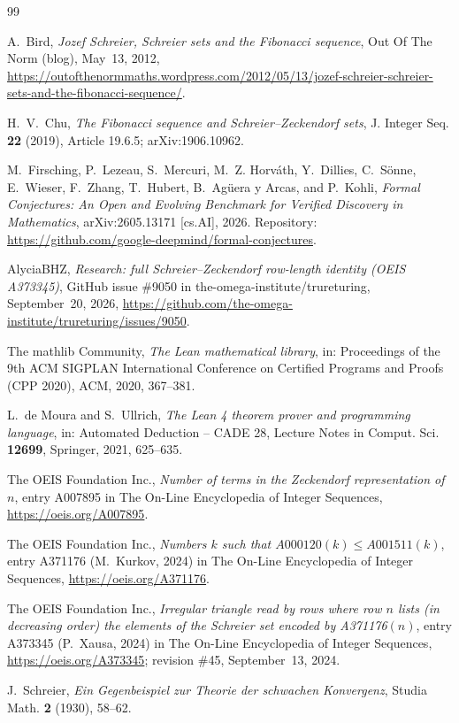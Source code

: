 \documentclass[11pt]{amsart}
\theoremstyle{plain}
\theoremstyle{definition}
\begin{document}
{\small\raggedright
\begin{thebibliography}{99}

A.~Bird, \emph{Jozef Schreier, Schreier sets and the Fibonacci sequence}, Out Of The Norm (blog), May~13, 2012, \url{https://outofthenormmaths.wordpress.com/2012/05/13/jozef-schreier-schreier-sets-and-the-fibonacci-sequence/}.

H.~V.~Chu, \emph{The Fibonacci sequence and Schreier--Zeckendorf sets}, J. Integer Seq. \textbf{22} (2019), Article 19.6.5; arXiv:1906.10962.

M.~Firsching, P.~Lezeau, S.~Mercuri, M.~Z. Horv\'ath, Y.~Dillies, C.~S\"onne, E.~Wieser, F.~Zhang, T.~Hubert, B.~Ag\"uera y Arcas, and P.~Kohli, \emph{Formal Conjectures: An Open and Evolving Benchmark for Verified Discovery in Mathematics}, arXiv:2605.13171 [cs.AI], 2026. Repository: \url{https://github.com/google-deepmind/formal-conjectures}.

AlyciaBHZ, \emph{Research: full Schreier--Zeckendorf row-length identity (OEIS A373345)}, GitHub issue \#9050 in the-omega-institute/trureturing, September~20, 2026, \url{https://github.com/the-omega-institute/trureturing/issues/9050}.

The mathlib Community, \emph{The Lean mathematical library}, in: Proceedings of the 9th ACM SIGPLAN International Conference on Certified Programs and Proofs (CPP 2020), ACM, 2020, 367--381.

L.~de Moura and S.~Ullrich, \emph{The Lean 4 theorem prover and programming language}, in: Automated Deduction -- CADE 28, Lecture Notes in Comput. Sci. \textbf{12699}, Springer, 2021, 625--635.

The OEIS Foundation Inc., \emph{Number of terms in the Zeckendorf representation of $n$}, entry A007895 in The On-Line Encyclopedia of Integer Sequences, \url{https://oeis.org/A007895}.

The OEIS Foundation Inc., \emph{Numbers $k$ such that $A000120(k)\le A001511(k)$}, entry A371176 (M.~Kurkov, 2024) in The On-Line Encyclopedia of Integer Sequences, \url{https://oeis.org/A371176}.

The OEIS Foundation Inc., \emph{Irregular triangle read by rows where row $n$ lists (in decreasing order) the elements of the Schreier set encoded by A371176$(n)$}, entry A373345 (P.~Xausa, 2024) in The On-Line Encyclopedia of Integer Sequences, \url{https://oeis.org/A373345}; revision \#45, September~13, 2024.

J.~Schreier, \emph{Ein Gegenbeispiel zur Theorie der schwachen Konvergenz}, Studia Math. \textbf{2} (1930), 58--62.

\end{thebibliography}
}
\end{document}
